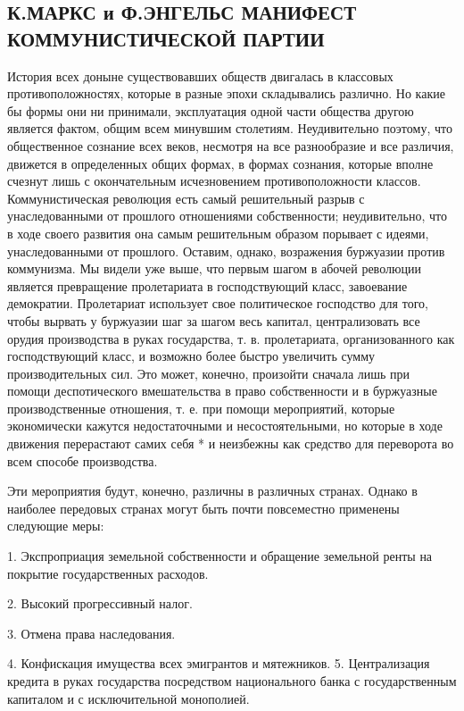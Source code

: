 \documentclass[12pt]{article}
\newcommand{\parnum}{(\arabic{parcount})}
\newcounter{parcount}
\newenvironment{parnumbers}{%
  \par%
  \everypar{\noindent \stepcounter{parcount}\marginpar[]{\parnum}}%
}{}
\begin{document}
\subsection{К.МАРКС и Ф.ЭНГЕЛЬС  МАНИФЕСТ КОММУНИСТИЧЕСКОЙ ПАРТИИ}
\begin{parnumbers}
История всех доныне существовавших обществ двигалась в классовых противоположностях, которые в разные эпохи складывались различно. Но какие бы формы они ни принимали, эксплуатация одной части общества другою является фактом, общим всем минувшим столетиям. Неудивительно поэтому, что общественное сознание всех веков, несмотря на все разнообразие и все различия, движется в определенных общих формах, в формах сознания, которые вполне счезнут лишь с окончательным исчезновением противоположности классов. Коммунистическая революция есть самый решительный разрыв с унаследованными от прошлого отношениями собственности; неудивительно, что в ходе своего развития она самым решительным образом порывает с идеями, унаследованными от прошлого. Оставим, однако, возражения буржуазии против коммунизма. Мы видели уже выше, что первым шагом в абочей революции является превращение пролетариата в господствующий класс, завоевание демократии. Пролетариат использует свое политическое господство для того, чтобы вырвать у буржуазии шаг за шагом весь капитал, централизовать все орудия производства в руках государства, т. в. пролетариата, организованного как господствующий класс, и возможно более быстро увеличить сумму производительных сил. Это может, конечно, произойти сначала лишь при помощи деспотического вмешательства в право собственности и в буржуазные производственные отношения, т. е. при помощи мероприятий, которые экономически кажутся недостаточными и несостоятельными, но которые в ходе движения перерастают самих себя * и неизбежны как средство для переворота во всем способе производства.

Эти мероприятия будут, конечно, различны в различных странах. Однако в наиболее передовых странах могут быть почти повсеместно применены следующие меры:
\end{parnumbers}

1. Экспроприация земельной собственности и обращение земельной ренты на покрытие государственных расходов.

2. Высокий прогрессивный налог.

3. Отмена права наследования.

4. Конфискация имущества всех эмигрантов и мятежников. 5. Централизация кредита в руках государства посредством национального банка с государственным капиталом и с исключительной монополией.
\end{document}
